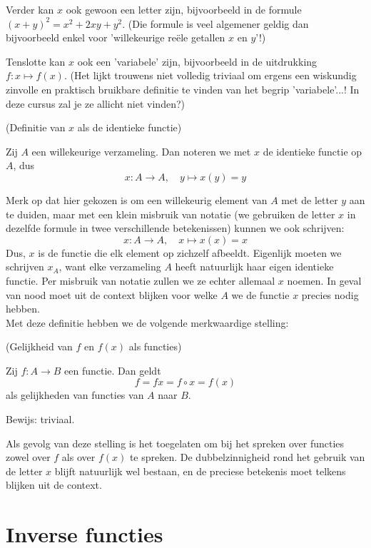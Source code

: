 \documentclass{ximera}
\begin{document}
Verder kan $x$ ook gewoon een letter zijn, bijvoorbeeld in de formule $(x+y)^2 = x^2+2xy+y^2$. (Die formule is veel algemener geldig dan bijvoorbeeld enkel voor 'willekeurige reële getallen $x$ en $y$'!)

Tenslotte kan $x$ ook een 'variabele' zijn, bijvoorbeeld in de uitdrukking $f:x\mapsto f(x)$. (Het lijkt trouwens niet volledig triviaal om ergens een wiskundig zinvolle en praktisch bruikbare definitie te vinden van het begrip 'variabele'...! In deze cursus zal je ze allicht niet vinden?)


\begin{definition} (Definitie van $x$ als de identieke functie)
    
    Zij $A$ een willekeurige verzameling. Dan noteren we met $x$ de identieke functie op $A$, dus
    $$
    x:A \to A,\quad y \mapsto x(y) = y
    $$
\end{definition}
Merk op dat hier gekozen is om een willekeurig element van $A$ met de letter $y$ aan te duiden, maar met een klein misbruik van notatie (we gebruiken de letter $x$ in dezelfde formule in twee verschillende betekenissen) kunnen we ook schrijven:
$$
    x:A \to A,\quad x \mapsto x(x) = x
$$
Dus, $x$ is de functie die elk element op zichzelf afbeeldt. Eigenlijk moeten we schrijven $x_A$, want elke verzameling $A$ heeft natuurlijk haar eigen identieke functie. Per misbruik van notatie zullen we ze echter allemaal $x$ noemen. In geval van nood moet uit de context blijken voor welke $A$ we de functie $x$ precies nodig hebben.
\\

Met deze definitie hebben we de volgende merkwaardige stelling:
\begin{proposition} (Gelijkheid van $f$ en $f(x)$ als functies)
    
    Zij $f:A\to B$ een functie. Dan geldt    
    $$
    f = fx = f\circ x = f(x)
    $$
    als gelijkheden van functies van $A$ naar $B$.
\end{proposition}
Bewijs: triviaal.

Als gevolg van deze stelling is het toegelaten om bij het spreken over functies zowel over $f$ als over $f(x)$ te spreken. De dubbelzinnigheid rond het gebruik van de letter $x$ blijft natuurlijk wel bestaan, en de preciese betekenis moet telkens blijken uit de context.


\section{Inverse functies}
\end{document}
